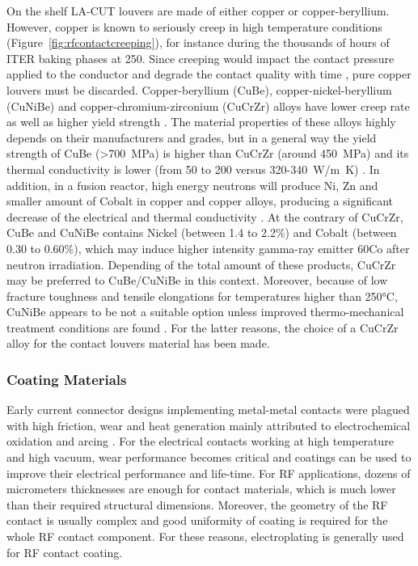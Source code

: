 {On the shelf LA-CUT louvers are made of either copper or copper-beryllium. However, copper is known to seriously creep in high temperature conditions (Figure~\ref{fig:rfcontactcreeping}), for instance during the thousands of hours of ITER baking phases at 250\degC. Since creeping would impact the contact pressure applied to the conductor and degrade the contact quality with time , pure copper louvers must be discarded. Copper-beryllium (CuBe), copper-nickel-beryllium (CuNiBe) and copper-chromium-zirconium (CuCrZr) alloys have lower creep rate as well as higher yield strength . The material properties of these alloys highly depends on their manufacturers and grades, but in a general way the yield strength of CuBe (>700~MPa) is higher than CuCrZr (around 450~MPa) and its thermal conductivity is lower (from 50 to 200 versus 320-340~\si{W/m.K}) \cite{li2012}. In addition, in a fusion reactor, high energy neutrons will produce Ni, Zn and smaller amount of Cobalt in copper and copper alloys, producing a significant decrease of the electrical and thermal conductivity  . At the contrary of CuCrZr, CuBe and CuNiBe contains Nickel (between 1.4 to 2.2\%) and Cobalt (between 0.30 to 0.60\%), which may induce higher intensity gamma-ray emitter 60Co after neutron irradiation. Depending of the total amount of these products, CuCrZr may be preferred to CuBe/CuNiBe in this context. Moreover, because of low fracture toughness and tensile elongations for temperatures higher than 250$\si{\degreeCelsius}$, CuNiBe appears to be not a suitable option unless improved thermo-mechanical treatment conditions are found . For the latter reasons, the choice of a CuCrZr alloy for the contact louvers material has been made.

\subsubsection{Coating Materials}
Early current connector designs implementing metal-metal contacts were plagued with high friction, wear and heat generation mainly attributed to electrochemical oxidation and arcing . For the electrical contacts working at high temperature and high vacuum, wear performance becomes critical and coatings can be used to improve their electrical performance and life-time. For RF applications, dozens of micrometers thicknesses are enough for contact materials, which is much lower than their required structural dimensions. Moreover, the geometry of the RF contact is usually complex and good uniformity of coating is required for the whole RF contact component. For these reasons, electroplating is generally used for RF contact coating.  

}
